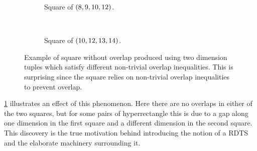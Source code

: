 \begin{figure}[ht]
    \centering
    \begin{subfigure}[b]{0.47\textwidth}
        \centering
            \begin{tikzpicture}[scale=0.12]
                
            \end{tikzpicture}
        \caption{Square of $\paren{8, 9, 10, 12}$.}
    \end{subfigure}
    ~
    \begin{subfigure}[b]{0.47\textwidth}
        \centering
            \begin{tikzpicture}[scale=0.12*39/49]
                
            \end{tikzpicture}
        \caption{Square of $\paren{10, 12, 13, 14}$.}
    \end{subfigure}
    \caption{Example of square without overlap produced using two dimension tuples which satisfy different non-trivial overlap inequalities. This is surprising since the square relies on non-trivial overlap inequalities to prevent overlap.}
    \label{fig:4d-square-universal}
\end{figure}
\cref{fig:4d-square-universal} illustrates an effect of this phenomenon. Here there are no overlaps in either of the two squares, but for some pairs of hyperrectangle this is due to a gap along one dimension in the first square and a different dimension in the second square. This discovery is the true motivation behind introducing the notion of a RDTS and the elaborate machinery surrounding it.

